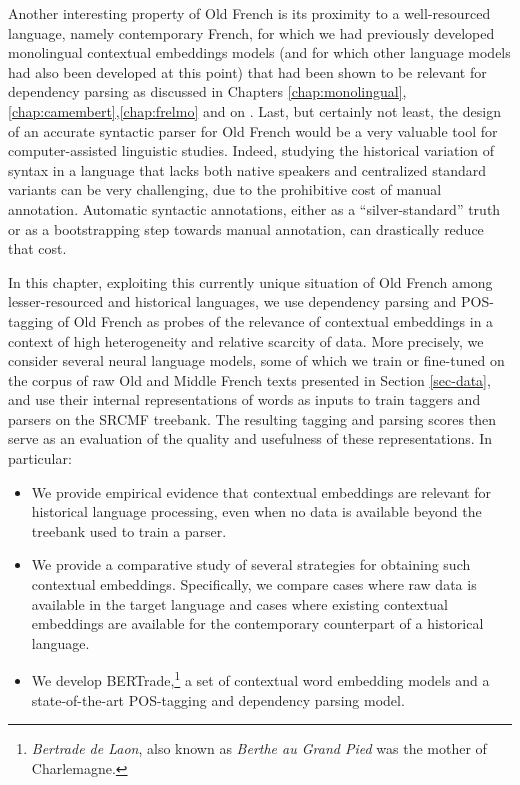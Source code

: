 Another interesting property of Old French is its proximity to a well-resourced language, namely contemporary French, for which we had previously developed monolingual contextual embeddings models (and for which other language models had also been developed at this point) that had been shown to be relevant for dependency parsing as discussed in Chapters \ref{chap:monolingual}, \ref{chap:camembert},\ref{chap:frelmo} and on \citep{martin-etal-2020-camembert,le-etal-2020-flaubert}. Last, but certainly not least, the design of an accurate syntactic parser for Old French would be a very valuable tool for computer-assisted linguistic studies. Indeed, studying the historical variation of syntax in a language that lacks both native speakers and centralized standard variants can be very challenging, due to the prohibitive cost of manual annotation. Automatic syntactic annotations, either as a \enquote{silver-standard} truth or as a bootstrapping step towards manual annotation, can drastically reduce that cost.

In this chapter, exploiting this currently unique situation of Old French among lesser-resourced and historical languages, we use dependency parsing and POS-tagging of Old French as probes of the relevance of contextual embeddings in a context of high heterogeneity and relative scarcity of data. More precisely, we consider several neural language models, some of which we train or fine-tuned on the corpus of raw Old and Middle French texts presented in Section \ref{sec-data}, and use their internal representations of words as inputs to train taggers and parsers on the SRCMF treebank. The resulting tagging and parsing scores then serve as an evaluation of the quality and usefulness of these representations. In particular:

\begin{itemize}
    \item We provide empirical evidence that contextual embeddings are relevant for historical language processing, even when no data is available beyond the treebank used to train a parser.
    \item We provide a comparative study of several strategies for obtaining such contextual embeddings. Specifically, we compare cases where raw data is available in the target language and cases where existing contextual embeddings are available for the contemporary counterpart of a historical language.
    \item We develop BERTrade,\footnote{\emph{Bertrade de Laon}, also known as \emph{Berthe au Grand Pied} was the mother of Charlemagne.} a set of contextual word embedding models and a state-of-the-art POS-tagging and dependency parsing model.
\end{itemize}

